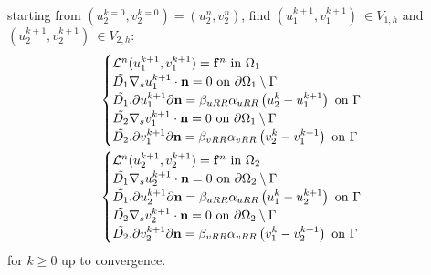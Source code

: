 starting from $(u_2^{k = 0}, v_2^{k = 0}) = (u_2^n, v_2^n)$, find $(u_1^{k+1}, v_1^{k+1}) \ \in V_{1,h}$ and $(u_2^{k+1}, v_2^{k+1}) \ \in V_{2,h}$:
\begin{equation}\label{eq::RRmodP}
\begin{aligned}
& \begin{cases}
\mathcal{L}^n (u_1^{k+1}, v_1^{k+1}) = \mathbf{f}^n \ \text{in} \ \Omega_1 \\
\Tilde{D_1} \nabla_s u_1^{k+1} \cdot \mathbf{n} = 0 \ \text{on} \ \partial \Omega_1 \setminus \Gamma \\
\Tilde{D_1} \displaystyle.{\partial u_1^{k+1}}{\partial \mathbf{n}} = \beta_{uRR} \alpha_{uRR} \left( u_2^{k} - u_1^{k+1} \right) \ \text{on} \ \Gamma \\
\Tilde{D_2} \nabla_s v_1^{k+1} \cdot \mathbf{n} = 0 \ \text{on} \ \partial \Omega_1 \setminus \Gamma \\
\Tilde{D_2} \displaystyle.{\partial v_1^{k+1}}{\partial \mathbf{n}} = \beta_{vRR} \alpha_{vRR} \left( v_2^{k} - v_1^{k+1} \right) \ \text{on} \ \Gamma
\end{cases}
\\
& \begin{cases}
\mathcal{L}^n (u_2^{k+1}, v_2^{k+1}) = \mathbf{f}^n \ \text{in} \ \Omega_2 \\
\Tilde{D_1} \nabla_s u_2^{k+1} \cdot \mathbf{n} = 0 \ \text{on} \ \partial \Omega_2 \setminus \Gamma \\
\Tilde{D_1} \displaystyle.{\partial u_2^{k+1}}{\partial \mathbf{n}} = \beta_{uRR} \alpha_{uRR} \left( u_1^{k} - u_2^{k+1} \right) \ \text{on} \ \Gamma \\
\Tilde{D_2} \nabla_s v_2^{k+1} \cdot \mathbf{n} = 0 \ \text{on} \ \partial \Omega_2 \setminus \Gamma\\
\Tilde{D_2} \displaystyle.{\partial v_2^{k+1}}{\partial \mathbf{n}} = \beta_{vRR} \alpha_{vRR} \left( v_1^{k} - v_2^{k+1} \right) \ \text{on} \ \Gamma
\end{cases}
\end{aligned}\end{equation}
 for $k \geq 0$ up to convergence.

